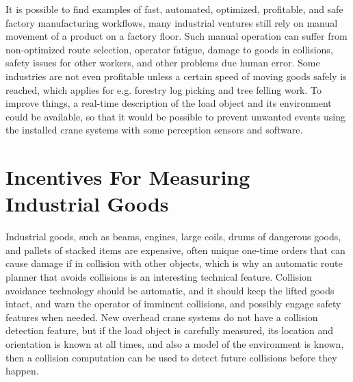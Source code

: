 \documentclass[12pt,a4paper,oneside,pdftex]{report}
\begin{document}


It is possible to find examples of fast, automated, optimized, profitable, and safe factory manufacturing workflows, many industrial ventures still rely on manual movement of a product on a factory floor. Such manual operation can suffer from non-optimized route selection, operator fatigue, damage to goods in collisions, safety issues for other workers, and other problems due human error. Some industries are not even profitable unless a certain speed of moving goods safely is reached, which applies for e.g. forestry log picking and tree felling work. To improve things, a real-time description of the load object and its environment could be available, so that it would be possible to prevent unwanted events using the installed crane systems with some perception sensors and software.

\section{Incentives For Measuring Industrial Goods}
\label{section:incentives_for_measuring_industrial_goods}

Industrial goods, such as beams, engines, large coils, drums of dangerous goods, and pallets of stacked items are expensive, often unique one-time orders that can cause damage if in collision with other objects, which is why an automatic route planner that avoids collisions is an interesting technical feature. Collision avoidance technology should be automatic, and it should keep the lifted goods intact, and warn the operator of imminent collisions, and possibly engage safety features when needed. New overhead crane systems do not have a collision detection feature, but if the load object is carefully measured, its location and orientation is known at all times, and also a model of the environment is known, then a collision computation can be used to detect future collisions before they happen.\par
\end{document}
